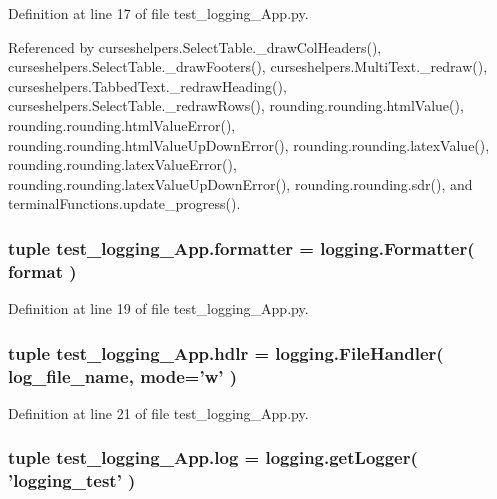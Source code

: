 Definition at line 17 of file test\-\_\-logging\-\_\-\-App.\-py.



Referenced by curseshelpers.\-Select\-Table.\-\_\-draw\-Col\-Headers(), curseshelpers.\-Select\-Table.\-\_\-draw\-Footers(), curseshelpers.\-Multi\-Text.\-\_\-redraw(), curseshelpers.\-Tabbed\-Text.\-\_\-redraw\-Heading(), curseshelpers.\-Select\-Table.\-\_\-redraw\-Rows(), rounding.\-rounding.\-html\-Value(), rounding.\-rounding.\-html\-Value\-Error(), rounding.\-rounding.\-html\-Value\-Up\-Down\-Error(), rounding.\-rounding.\-latex\-Value(), rounding.\-rounding.\-latex\-Value\-Error(), rounding.\-rounding.\-latex\-Value\-Up\-Down\-Error(), rounding.\-rounding.\-sdr(), and terminal\-Functions.\-update\-\_\-progress().

\subsubsection[{formatter}]{\setlength{\rightskip}{0pt plus 5cm}tuple test\-\_\-logging\-\_\-\-App.\-formatter = logging.\-Formatter( {\bf format} )}\label{namespacetest__logging__App_aab261ad66d0b9deb3ded5b012f19b218}


Definition at line 19 of file test\-\_\-logging\-\_\-\-App.\-py.

\subsubsection[{hdlr}]{\setlength{\rightskip}{0pt plus 5cm}tuple test\-\_\-logging\-\_\-\-App.\-hdlr = logging.\-File\-Handler( {\bf log\-\_\-file\-\_\-name}, mode='w' )}\label{namespacetest__logging__App_ab4a8f9d05288bd9c810bc3b3863167ae}


Definition at line 21 of file test\-\_\-logging\-\_\-\-App.\-py.

\subsubsection[{log}]{\setlength{\rightskip}{0pt plus 5cm}tuple test\-\_\-logging\-\_\-\-App.\-log = logging.\-get\-Logger( 'logging\-\_\-test' )}\label{namespacetest__logging__App_a5661d99b9ac2ebd5efc47fa7c851410e}


